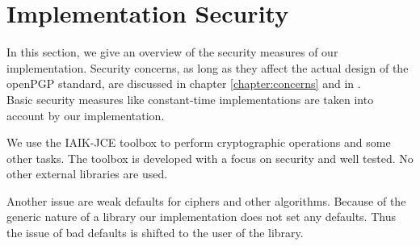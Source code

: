 \newpage

\section{Implementation Security}
In this section, we give an overview of the security measures of our implementation. 
Security concerns, as long as they affect the actual design of the openPGP standard, are discussed in chapter \ref{chapter:concerns} and in \cite[section 14]{RFC4880}.  \\

Basic security measures like constant-time implementations are taken into account by our implementation. 

We use the IAIK-JCE toolbox to perform cryptographic operations and some other tasks. The toolbox is developed with a focus on security and well tested. No other external libraries are used. 

Another issue are weak defaults for ciphers and other algorithms. Because of the generic nature of a library our implementation does not set any defaults. Thus the issue of bad defaults is shifted to the user of the library. \\







